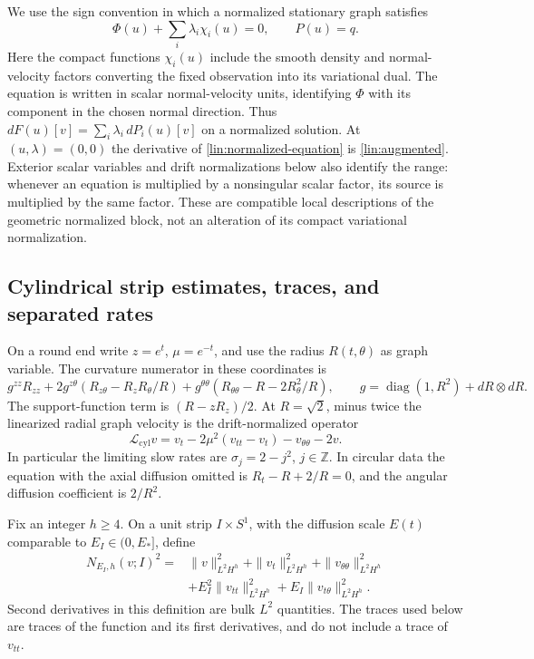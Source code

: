 We use the sign convention in which a normalized stationary graph
satisfies
\begin{equation}\label{lin:normalized-equation}
 \Phi(u)+\sum_i\lambda_i\chi_i(u)=0,\qquad P(u)=q.
\end{equation}
Here the compact functions $\chi_i(u)$ include the smooth density and
normal-velocity factors converting the fixed observation into its
variational dual.  The equation is written in scalar normal-velocity
units, identifying $\Phi$ with its component in the chosen normal
direction.  Thus
$dF(u)[v]=\sum_i\lambda_i\,dP_i(u)[v]$ on a normalized solution.
At $(u,\lambda)=(0,0)$ the derivative of
\eqref{lin:normalized-equation} is \eqref{lin:augmented}.
Exterior scalar variables and drift normalizations below also identify
the range: whenever an equation is multiplied by a nonsingular scalar
factor, its source is multiplied by the same factor.  These are
compatible local descriptions of the geometric normalized block, not
an alteration of its compact variational normalization.

\subsection{Cylindrical strip estimates, traces, and separated rates}

On a round end write $z=e^t$, $\mu=e^{-t}$, and use the radius
$R(t,\theta)$ as graph variable.  The curvature numerator in these
coordinates is
\[
 g^{zz}R_{zz}+2g^{z\theta}
       (R_{z\theta}-R_zR_\theta/R)
       +g^{\theta\theta}(R_{\theta\theta}-R-2R_\theta^2/R),
 \qquad g=\operatorname{diag}(1,R^2)+dR\otimes dR.
\]
The support-function term is $(R-zR_z)/2$.  At $R=\sqrt2$, minus twice
the linearized radial graph velocity is the drift-normalized operator
\begin{equation}\label{lin:cylinder-operator}
 \mathcal L_{\mathrm{cyl}}v
 =v_t-2\mu^2(v_{tt}-v_t)-v_{\theta\theta}-2v.
\end{equation}
In particular the limiting slow rates are
$\sigma_j=2-j^2$, $j\in\mathbb Z$.  In circular data the equation with
the axial diffusion omitted is $R_t-R+2/R=0$, and the angular diffusion
coefficient is $2/R^2$.

Fix an integer $h\ge4$.  On a unit strip $I\times S^1$, with the
diffusion scale $E(t)$ comparable to $E_I\in(0,E_*]$, define
\begin{equation}\label{lin:strip-norm}
 \begin{split}
 N_{E_I,h}(v;I)^2={}&\|v\|_{L^2H^h}^2+\|v_t\|_{L^2H^h}^2
 +\|v_{\theta\theta}\|_{L^2H^h}^2\\
 &+E_I^2\|v_{tt}\|_{L^2H^h}^2
 +E_I\|v_{t\theta}\|_{L^2H^h}^2.
 \end{split}
\end{equation}
Second derivatives in this definition are bulk $L^2$ quantities.
The traces used below are traces of the function and its first
derivatives, and do not include a trace of $v_{tt}$.

